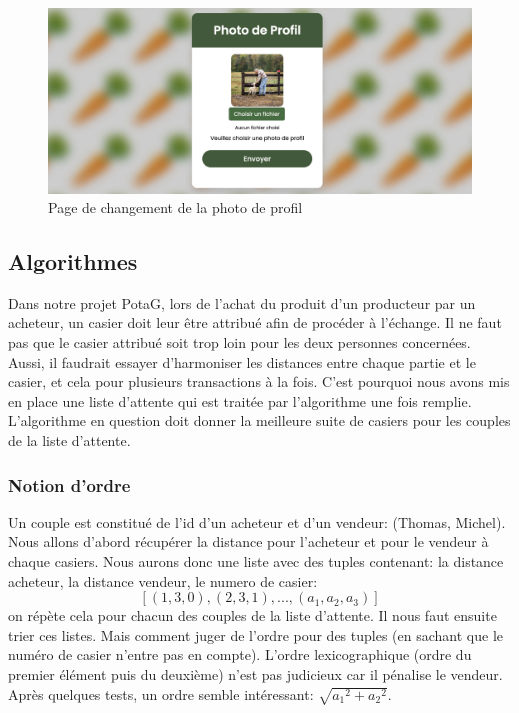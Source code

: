 \documentclass[11pt]{article}
\begin{document}
\begin{figure}[h]
    \centering
    \includegraphics[scale=0.4]{ScreenPhotoProfil.png}
    \caption{Page de changement de la photo de profil}
\end{figure}

\subsection{Algorithmes}

Dans notre projet PotaG, lors de l'achat du produit d'un producteur par un acheteur, un casier doit leur être attribué afin de procéder à l'échange. Il ne faut pas que le casier attribué soit trop loin pour les deux personnes concernées. Aussi, il faudrait essayer d'harmoniser les distances entre chaque partie et le casier, et cela pour plusieurs transactions à la fois. C'est pourquoi nous avons mis en place une liste d'attente qui est traitée par l'algorithme une fois remplie. L’algorithme en question doit donner la meilleure suite de casiers pour les couples de la liste d'attente.

\subsubsection{Notion d'ordre}
Un couple est constitué de l'id d'un acheteur et d'un vendeur: (Thomas, Michel). Nous allons d'abord récupérer la distance pour l'acheteur et pour le vendeur à chaque casiers. Nous aurons donc une liste avec des tuples contenant: la distance acheteur, la distance vendeur, le numero de casier: $$[(1, 3, 0),(2, 3, 1),...,(a_1, a_2, a_3)]$$ on répète cela pour chacun des couples de la liste d'attente. Il nous faut ensuite trier ces listes. Mais comment juger de l'ordre pour des tuples (en sachant que le numéro de casier n'entre pas en compte). L'ordre lexicographique (ordre du premier élément puis du deuxième) n'est pas judicieux car il pénalise le vendeur. Après quelques tests, un ordre semble intéressant: $\sqrt{{a_1}^2+{a_2}^2}$.
\end{document}
